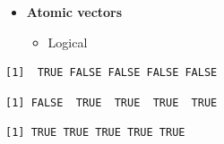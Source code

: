 \documentclass[
  ignorenonframetext,
]{beamer}
\newenvironment{Shaded}{\begin{snugshade}}{\end{snugshade}}
\newcommand{\DecValTok}[1]{\textcolor[rgb]{0.68,0.00,0.00}{#1}}
\newcommand{\FunctionTok}[1]{\textcolor[rgb]{0.28,0.35,0.67}{#1}}
\newcommand{\NormalTok}[1]{\textcolor[rgb]{0.00,0.23,0.31}{#1}}
\newcommand{\SpecialCharTok}[1]{\textcolor[rgb]{0.37,0.37,0.37}{#1}}
\providecommand{\tightlist}{%
  \setlength{\itemsep}{0pt}\setlength{\parskip}{0pt}}\usepackage{longtable,booktabs,array}
\begin{document}
\begin{frame}[fragile]{}
\label{section-8}
\begin{itemize}
\item
  \textbf{Atomic vectors}

  \begin{itemize}
  \tightlist
  \item
    Logical
  \end{itemize}
\end{itemize}

\tiny

\begin{Shaded}
\end{Shaded}

\begin{verbatim}
[1]  TRUE FALSE FALSE FALSE FALSE
\end{verbatim}

\begin{Shaded}
\end{Shaded}

\begin{verbatim}
[1] FALSE  TRUE  TRUE  TRUE  TRUE
\end{verbatim}

\begin{Shaded}
\end{Shaded}

\begin{verbatim}
[1] TRUE TRUE TRUE TRUE TRUE
\end{verbatim}
\end{frame}
\end{document}
